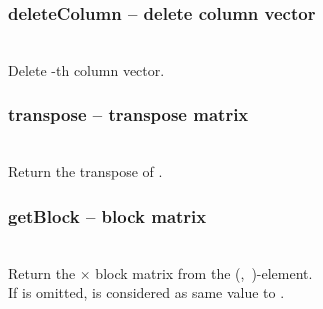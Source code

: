   \subsubsection{deleteColumn -- delete column vector}
   \\
   \spacing
   \quad Delete -th column vector.\\
   \spacing
  \subsubsection{transpose -- transpose matrix}
   \\
   \spacing
   \quad Return the transpose of .\\
   \spacing
  \subsubsection{getBlock -- block matrix}
   \\
   \spacing
   \quad Return the $\times$ block matrix from the (,\ )-element. \\
   \spacing
   If  is omitted,  is considered as same value to .
